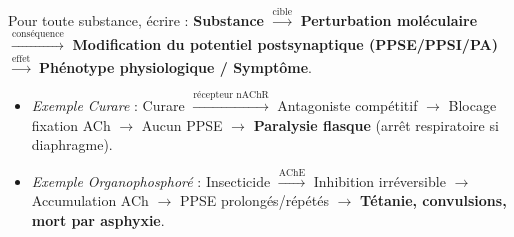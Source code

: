 \documentclass[11pt]{article}
\begin{document}
\begin{methode}
Pour toute substance, écrire : 
\textbf{Substance} $\xrightarrow{\text{cible}}$ \textbf{Perturbation moléculaire} $\xrightarrow{\text{conséquence}}$ \textbf{Modification du potentiel postsynaptique (PPSE/PPSI/PA)} $\xrightarrow{\text{effet}}$ \textbf{Phénotype physiologique / Symptôme}.
\begin{itemize}
\item \textit{Exemple Curare} : Curare $\xrightarrow{\text{récepteur nAChR}}$ Antagoniste compétitif $\xrightarrow{}$ Blocage fixation ACh $\xrightarrow{}$ Aucun PPSE $\xrightarrow{}$ \textbf{Paralysie flasque} (arrêt respiratoire si diaphragme).
\item \textit{Exemple Organophosphoré} : Insecticide $\xrightarrow{\text{AChE}}$ Inhibition irréversible $\xrightarrow{}$ Accumulation ACh $\xrightarrow{}$ PPSE prolongés/répétés $\xrightarrow{}$ \textbf{Tétanie, convulsions, mort par asphyxie}.
\end{itemize}
\end{methode}
\end{document}
